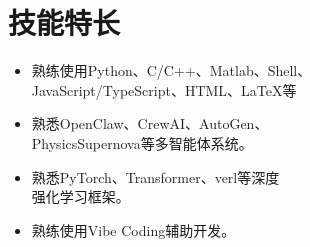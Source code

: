 \documentclass[11pt]{article}
\newlength{\iconwidth}
\begin{document}
    \begin{minipage}[t]{0.42\textwidth}
        \vspace{0pt}
        \section[技能特长]{\makebox[\iconwidth][c]{\color{primary_color}{\faWrench}}\quad 技能特长}
        {\small\sloppy
        \begin{itemize}
            \item 熟练使用Python、C/C++、Matlab、Shell、\\JavaScript/TypeScript、HTML、LaTeX等
            \vspace{0.2cm}
            \item 熟悉OpenClaw、CrewAI、AutoGen、\\PhysicsSupernova等多智能体系统。
            \vspace{0.2cm}
            \item 熟悉PyTorch、Transformer、verl等深度\\强化学习框架。
            \vspace{0.2cm}
            \item 熟练使用Vibe Coding辅助开发。\\
        \end{itemize}
        }
    \end{minipage}


    
\end{document}
